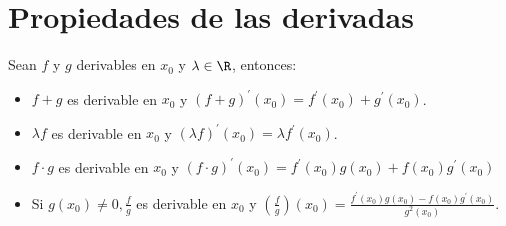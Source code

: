 \section{Propiedades de las derivadas}
\begin{proposition}
	Sean \(f \) y \(g \) derivables en \(x_0 \) y \(\lambda \in \R \), entonces:
	\begin{itemize}
		\item \(f +g \) es derivable en \(x_0 \) y \((f + g)^\prime (x_0) = f^\prime (x_0) + g^\prime (x_0 )\).
		\item \(\lambda f \) es derivable en \(x_0 \) y \((\lambda f)^\prime (x_0) = \lambda f^\prime (x_0)\).
		\item \(f \cdot g \) es derivable en \(x_0 \) y \((f \cdot g)^\prime (x_0) = f^\prime (x_0) g (x_0) + f(x_0) g^\prime (x_0 )\)
		\item Si \(g(x_0) \neq 0, \frac{f}{g}\) es derivable en \(x_0 \) y \((\frac{f}{g}) (x_0) = \frac{f^\prime (x_0) g(x_0) - f(x_0) g^\prime (x_0)}{g^{2}(x_0) }\).
	\end{itemize}
\end{proposition}
